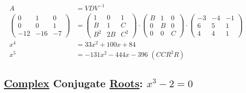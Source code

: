 \documentclass[12pt,a4paper]{article}
\begin{document}
\begin{align}
A &= VDV^{-1} \\
\left( \begin{matrix} 0 & 1 & 0 \\ 0 & 0 & 1 \\ -12 & -16 & -7 \end{matrix} \right)
&=
\left( \begin{matrix}  1 & 0 & 1 \\ B & 1 & C \\ B^2 & 2B & C^2  \end{matrix} \right) \cdot
\left( \begin{matrix} B & 1 & 0 \\  0 & B & 0 \\ 0 & 0 & C  \end{matrix} \right) \cdot
\left( \begin{matrix} -3 & -4 & -1 \\ 6 & 5 & 1 \\ 4 & 4 & 1 \end{matrix} \right) \\
x^4 &= 33 x^2 + 100 x + 84 \\
x^5 &= - 131 x^2 - 444 x - 396\,\,(CCR^2R)
\end{align}

\subsection{\href{}{Complex} Conjugate \href{}{Roots}: $x^3 - 2 = 0$}
\end{document}
